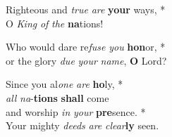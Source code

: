 Righteous and \emph{true} \emph{are} \textbf{your} ways, *\\
O \emph{King} \emph{of} \emph{the} \textbf{na}tions!

Who would dare re\emph{fuse} \emph{you} \textbf{hon}or, *\\
or the glory \emph{due} \emph{your} \emph{name}, \textbf{O} Lord?

Since you al\emph{one} \emph{are} \textbf{ho}ly, *\\
\emph{all} \emph{na}-\textbf{tions} \textbf{shall} come\\
and worship \emph{in} \emph{your} \textbf{pre}sence. *\\
Your mighty \emph{deeds} \emph{are} \emph{clear}\textbf{ly} seen.


